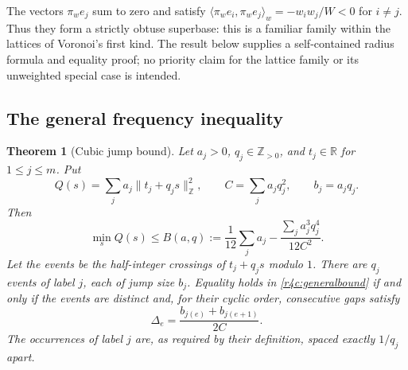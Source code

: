 \documentclass[11pt,a4paper]{article}
\newtheorem{theorem}{Theorem}[section]
\theoremstyle{definition}\newtheorem{definition}[theorem]{Definition}
\theoremstyle{remark}\newtheorem{remark}[theorem]{Remark}
\newcommand{\R}{\mathbb R}\newcommand{\Z}{\mathbb Z}
\numberwithin{equation}{section}
\begin{document}
The vectors $\pi_we_j$ sum to zero and satisfy
$\langle\pi_we_i,\pi_we_j\rangle_w=-w_iw_j/W<0$ for $i\ne j$.
Thus they form a strictly obtuse superbase: this is a familiar family
within the lattices of Voronoi's first kind.  The result below supplies
a self-contained radius formula and equality proof; no priority claim
for the lattice family or its unweighted special case is intended.

\subsection{The general frequency inequality}

\begin{theorem}[Cubic jump bound]\label{r4c:cubic}
Let $a_j>0$, $q_j\in\Z_{>0}$, and $t_j\in\R$ for $1\leq j\leq m$.
Put
\[
 Q(s)=\sum_j a_j\|t_j+q_js\|_{\Z}^2,
 \qquad C=\sum_j a_jq_j^2,
 \qquad b_j=a_jq_j.
\]
Then
\begin{equation}\label{r4c:generalbound}
 \min_s Q(s)\leq
 B(a,q):=\frac1{12}\sum_j a_j
       -\frac{\sum_j a_j^3q_j^4}{12C^2}.
\end{equation}
Let the events be the half-integer crossings of $t_j+q_js$ modulo $1$.
There are $q_j$ events of label $j$, each of jump size $b_j$.
Equality holds in \eqref{r4c:generalbound} if and only if the events
are distinct and, for their cyclic order, consecutive gaps satisfy
\begin{equation}\label{r4c:eventgaps}
 \Delta_e=\frac{b_{j(e)}+b_{j(e+1)}}{2C}.
\end{equation}
The occurrences of label $j$ are, as required by their definition,
spaced exactly $1/q_j$ apart.
\end{theorem}
\end{document}
